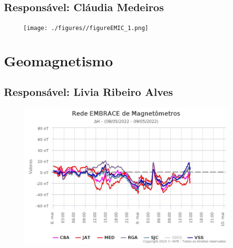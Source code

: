 \documentclass[a4paper, 10pt]{article}
\begin{document}
 \subsection{Responsável: Cláudia Medeiros} 
 
\begin{figure}[H]
    
                        \centering
   
                             \texttt{[image: ./figures//figureEMIC\_1.png]}

                        \end{figure}

                     \section{Geomagnetismo} 
 \subsection{Responsável: Livia Ribeiro Alves} 
 
\begin{figure}[H]
    
                        \centering
   
                             \includegraphics[width=14cm]{./figures//figureGeomag_0.png}

                        \end{figure}
\end{document}
